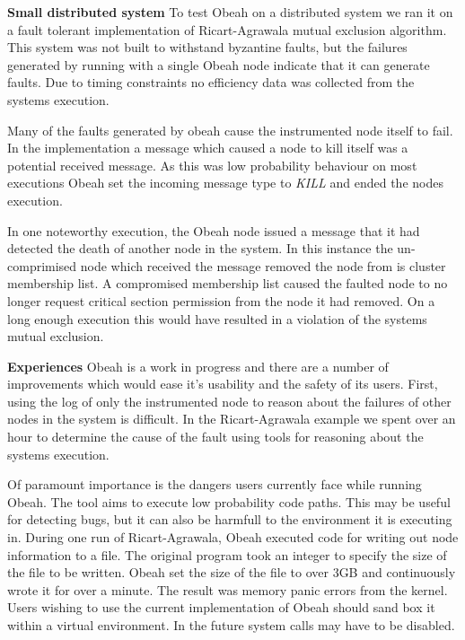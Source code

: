 \noindent\textbf{Small distributed system} To test Obeah on a distributed
system we ran it on a fault tolerant implementation of Ricart-Agrawala mutual
exclusion algorithm. This system was not built to withstand byzantine faults,
but the failures generated by running with a single Obeah node indicate that it
can generate faults. Due to timing constraints no efficiency data was collected
from the systems execution.

Many of the faults generated by obeah cause the instrumented node itself to
fail. In the implementation a message which caused a node to kill itself was a
potential received message. As this was low probability behaviour on most executions
Obeah set the incoming message type to \emph{KILL} and ended the nodes
execution.

In one noteworthy execution, the Obeah node issued a message that it had
detected the death of another node in the system. In this instance the
un-comprimised node which received the message removed the node from is cluster
membership list. A compromised membership list caused the faulted node to no
longer request critical section permission from the node it had removed. On a
long enough execution this would have resulted in a violation of the systems
mutual exclusion.

\noindent\textbf{Experiences} Obeah is a work in progress and there are a
number of improvements which would ease it's usability and the safety of its
users. First, using the log of only the instrumented node to reason about the
failures of other nodes in the system is difficult. In the Ricart-Agrawala
example we spent over an hour to determine the cause of the fault using tools
for reasoning about the systems execution.

Of paramount importance is the dangers users currently face while running
Obeah. The tool aims to execute low probability code paths. This may be useful
for detecting bugs, but it can also be harmfull to the environment it is
executing in. During one run of Ricart-Agrawala, Obeah executed code for
writing out node information to a file. The original program took an integer to
specify the size of the file to be written. Obeah set the size of the file to
over 3GB and continuously wrote it for over a minute. The result was memory
panic errors from the kernel. Users wishing to use the current implementation of
Obeah should sand box it within a virtual environment. In the future system
calls may have to be disabled.

